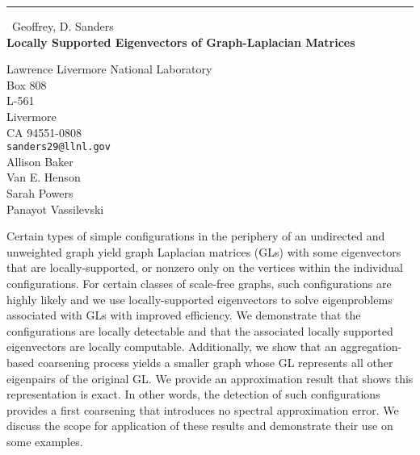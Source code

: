 \documentclass{report}
\begin{document}
\begin{center}
\rule{6in}{1pt} \
{\large Geoffrey, D. Sanders \\
{\bf Locally Supported Eigenvectors of Graph-Laplacian Matrices}}

Lawrence Livermore National Laboratory \\ Box 808 \\ L-561 \\ Livermore \\ CA 94551-0808
\\
{\tt sanders29@llnl.gov}\\
Allison Baker\\
Van E. Henson\\
Sarah Powers\\
Panayot Vassilevski\end{center}

Certain types of simple configurations in the periphery of an undirected
and unweighted graph yield graph Laplacian matrices (GLs) with some
eigenvectors that are locally-supported, or nonzero only on the vertices
within the individual configurations. For certain classes of scale-free
graphs, such configurations are highly likely and we use
locally-supported eigenvectors to solve eigenproblems associated with GLs
with improved efficiency. We demonstrate that the configurations are
locally detectable and that the associated locally supported eigenvectors
are locally computable. Additionally, we show that an aggregation-based
coarsening process yields a smaller graph whose GL represents all other
eigenpairs of the original GL. We provide an approximation result that
shows this representation is exact. In other words, the detection of such
configurations provides a first coarsening that introduces no spectral
approximation error. We discuss the scope for application of these
results and demonstrate their use on some examples.
\end{document}
